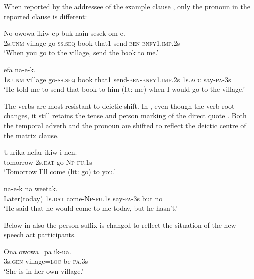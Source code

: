 When reported by the addressee of the example clause , only the pronoun in the reported clause  is different:

\ea%
\label{ex:8:x1281}
\gll No  owowa  ikiw-ep  buk  nain  sesek-om-e.\\
2s.\textsc{unm} village  go-\textsc{ss}.\textsc{seq} book that1  send-\textsc{ben}-\textsc{bnfy}1.\textsc{imp}.2s\\
\glt`When you go to the village, send the book to me.'
\z


\ea%
\label{ex:8:x1282}
 efa  na-e-k. \\
1s.\textsc{unm} village go-\textsc{ss}.\textsc{seq} book that1 send-\textsc{ben}-\textsc{bnfy}1.\textsc{imp}.2s 1s.\textsc{acc} say-\textsc{pa}-3s\\
\glt`He told me to send that book to him (lit: me) when I would go to the village.'
\z


The verbs are most resistant to deictic shift. In , even though the verb root changes, it still retains the tense and person marking of the direct quote . Both the temporal adverb and the pronoun are shifted to reflect the deictic centre of the matrix clause.

\ea%
\label{ex:8:x1264}
\gll Uurika  nefar  ikiw-i-nen. \\
tomorrow  2s.\textsc{dat} go-\textsc{Np}-\textsc{fu}.1s\\
\glt`Tomorrow I'll come (lit: go) to you.'
\z


\ea%
\label{ex:8:x1265}
  na-e-k  na  weetak.\\
Later(today)  1s.\textsc{dat} come-\textsc{Np}-\textsc{fu}.1s  say-\textsc{pa}-3s but no\\
\glt`He said that he would come to me today, but he hasn't.'
\z


Below in  also the person suffix is changed to reflect the situation of the new speech act participants. 

\ea%
\label{ex:8:x1267}
\gll Ona  owowa=pa  ik-ua.\\
3s.\textsc{gen} village=\textsc{loc} be-\textsc{pa}.3s\\
\glt`She is in her own village.'
\z


